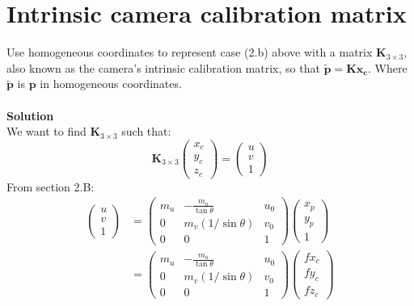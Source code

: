 \documentclass[a4paper,12pt]{article}
\begin{document}
\section{Intrinsic camera calibration matrix}
Use homogeneous coordinates to represent case (2.b) above with a matrix $\mathbf{K}_{3\times 3}$, also known as the camera's intrinsic calibration matrix, so that $\mathbf{\tilde{p} = \mathbf{Kx}_c}$. Where $\tilde{\mathbf{p}}$ is $\mathbf{p}$ in homogeneous coordinates.\\\\
\textbf{Solution}\\
We want to find $\mathbf{K}_{3\times 3}$ such that:
$$
\mathbf{K}_{3\times 3}
\begin{pmatrix}
x_c \\
y_c \\
z_c
\end{pmatrix} = 
\begin{pmatrix}
u\\
v\\
1
\end{pmatrix}
$$
From section 2.B:
\begin{equation}
\begin{split}
\begin{pmatrix}
u\\v\\1
\end{pmatrix} & = 
\begin{pmatrix}
    m_u & -\frac{m_u}{\tan \theta} & u_0\\
    0 & m_v (1 /\sin \theta) & v_0\\
    0 & 0 & 1
\end{pmatrix} 
\begin{pmatrix}
x_p\\y_p\\1
\end{pmatrix} \\
& = 
\begin{pmatrix}
    m_u & -\frac{m_u}{\tan \theta} & u_0\\
    0 & m_v (1 /\sin \theta) & v_0\\
    0 & 0 & 1
\end{pmatrix} 
\begin{pmatrix}
fx_c\\fy_c\\fz_c
\end{pmatrix}
\end{split}
\end{equation}
\end{document}
